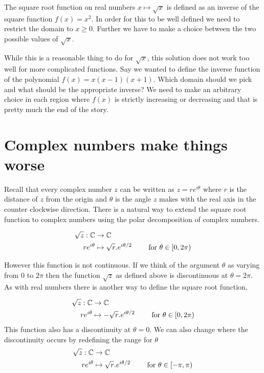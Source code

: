 The square root function on real numbers $x \mapsto \sqrt{x}$ is defined as an inverse of the square function $f(x) = x^2$. In order for this to be well defined we need to restrict the domain to $x \ge 0$. Further we have to make a choice between the two possible values of $\sqrt{x}$.

While this is a reasonable thing to do for $\sqrt{x}$, this solution does not work too well for more complicated functions. Say we wanted to define the inverse function of the polynomial $f(x) = x(x-1)(x+1)$. Which domain should we pick and what should be the appropriate inverse? We need to make an arbitrary choice in each region where $f(x)$ is strictly increasing or decreasing and that is pretty much the end of the story.


\section{Complex numbers make things worse}
Recall that every complex number $z$ can be written as $z = r e ^{i \theta}$ where $r$ is the distance of $z$ from the origin and $\theta$ is the angle $z$ makes with the real axis in the counter clockwise direction. There is a natural way to extend the square root function to complex numbers using the polar decomposition of complex numbers.

\begin{align}
	\sqrt{z} : \mathbb{C}  & \rightarrow \mathbb{C}                                                          \\
	r e^{i \theta} & \mapsto \sqrt{r}.e^{i \theta/2} \qquad \mbox{ for } \theta \in [0,2\pi)
\end{align}

However this function is not continuous. If we think of the argument $\theta$ as varying from $0$ to $2 \pi$ then the function $\sqrt{z}$ as defined above is discontinuous at $\theta = 2 \pi$. As with real numbers there is another way to define the square root function,

\begin{align}
	\sqrt{z} : \mathbb{C}  & \rightarrow \mathbb{C}                                                           \\
	r e^{i \theta} & \mapsto -\sqrt{r}.e^{i \theta/2} \qquad \mbox{ for } \theta \in [0,2\pi)
\end{align}
This function also has a discontinuity at $\theta = 0$. We can also change where the discontinuity occurs by redefining the range for $\theta$
\begin{align}
	\sqrt{z} : \mathbb{C}  & \rightarrow \mathbb{C}                                                            \\
	r e^{i \theta} & \mapsto \sqrt{r}.e^{i \theta/2} \qquad \mbox{ for } \theta \in [-\pi,\pi)
\end{align}

